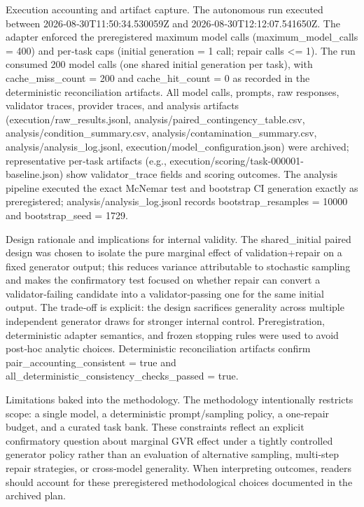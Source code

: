 \documentclass[conference]{IEEEtran}
\begin{document}
Execution accounting and artifact capture. The autonomous run executed between 2026‑08‑30T11:50:34.530059Z and 2026‑08‑30T12:12:07.541650Z. The adapter enforced the preregistered maximum model calls (maximum\_model\_calls = 400) and per‑task caps (initial generation = 1 call; repair calls <= 1). The run consumed 200 model calls (one shared initial generation per task), with cache\_miss\_count = 200 and cache\_hit\_count = 0 as recorded in the deterministic reconciliation artifacts. All model calls, prompts, raw responses, validator traces, provider traces, and analysis artifacts (execution/raw\_results.jsonl, analysis/paired\_contingency\_table.csv, analysis/condition\_summary.csv, analysis/contamination\_summary.csv, analysis/analysis\_log.jsonl, execution/model\_configuration.json) were archived; representative per‑task artifacts (e.g., execution/scoring/task-000001-baseline.json) show validator\_trace fields and scoring outcomes. The analysis pipeline executed the exact McNemar test and bootstrap CI generation exactly as preregistered; analysis/analysis\_log.jsonl records bootstrap\_resamples = 10000 and bootstrap\_seed = 1729.

Design rationale and implications for internal validity. The shared\_initial paired design was chosen to isolate the pure marginal effect of validation+repair on a fixed generator output; this reduces variance attributable to stochastic sampling and makes the confirmatory test focused on whether repair can convert a validator‑failing candidate into a validator‑passing one for the same initial output. The trade‑off is explicit: the design sacrifices generality across multiple independent generator draws for stronger internal control. Preregistration, deterministic adapter semantics, and frozen stopping rules were used to avoid post‑hoc analytic choices. Deterministic reconciliation artifacts confirm pair\_accounting\_consistent = true and all\_deterministic\_consistency\_checks\_passed = true.

Limitations baked into the methodology. The methodology intentionally restricts scope: a single model, a deterministic prompt/sampling policy, a one‑repair budget, and a curated task bank. These constraints reflect an explicit confirmatory question about marginal GVR effect under a tightly controlled generator policy rather than an evaluation of alternative sampling, multi‑step repair strategies, or cross‑model generality. When interpreting outcomes, readers should account for these preregistered methodological choices documented in the archived plan.
\end{document}
